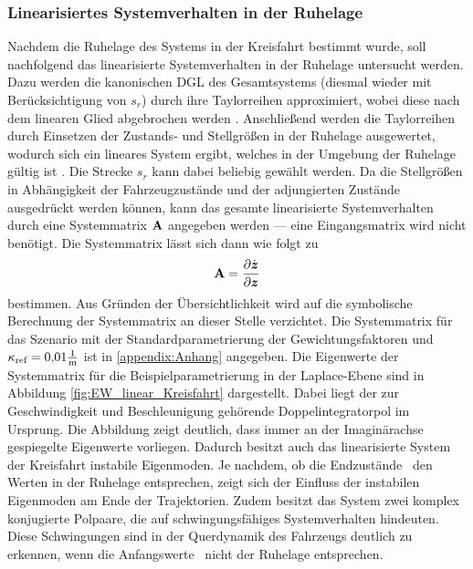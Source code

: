 \subsubsection{Linearisiertes Systemverhalten in der Ruhelage}\label{subsubsec:Linearisierung}
Nachdem die Ruhelage des Systems in der Kreisfahrt bestimmt wurde, soll nachfolgend das linearisierte Systemverhalten in der Ruhelage untersucht werden. Dazu werden die kanonischen \gls{DGL} des Gesamtsystems (diesmal wieder mit Berücksichtigung von $s_r$) durch ihre Taylorreihen approximiert, wobei diese nach dem linearen Glied abgebrochen werden \cite{Modellbildung}. Anschließend werden die Taylorreihen durch Einsetzen der Zustands- und Stellgrößen in der Ruhelage ausgewertet, wodurch sich ein lineares System ergibt, welches in der Umgebung der Ruhelage gültig ist \cite{Modellbildung}. Die Strecke $s_r$ kann dabei beliebig gewählt werden. Da die Stellgrößen in Abhängigkeit der Fahrzeugzustände und der adjungierten Zustände ausgedrückt werden können, kann das gesamte linearisierte Systemverhalten durch eine Systemmatrix ${\boldsymbol{\mathrm{A}}}$ angegeben werden --- eine Eingangsmatrix wird nicht benötigt. Die Systemmatrix lässt sich dann wie folgt zu
\begin{equation}
{\ensuremath{\boldsymbol{\mathrm{A}}}} = \frac{\partial \dot{\boldsymbol{z}}}{\partial \boldsymbol{z}}
\end{equation}
bestimmen. Aus Gründen der Übersichtlichkeit wird auf die symbolische Berechnung der Systemmatrix an dieser Stelle verzichtet. Die Systemmatrix für das Szenario mit der Standardparametrierung der Gewichtungsfaktoren und $\kappa_{\textrm{ref}} = 0{,}01\frac{1}{\mathrm{m}}$ ist in \ref{appendix:Anhang} angegeben. Die Eigenwerte der Systemmatrix für die Beispielparametrierung in der Laplace-Ebene sind in Abbildung \ref{fig:EW_linear_Kreisfahrt} dargestellt. Dabei liegt der zur Geschwindigkeit und Beschleunigung gehörende Doppelintegratorpol im Ursprung. Die Abbildung zeigt deutlich, dass immer an der Imaginärachse gespiegelte Eigenwerte vorliegen. Dadurch besitzt auch das linearisierte System der Kreisfahrt instabile Eigenmoden. Je nachdem, ob die Endzustände \zoftf~den Werten in der Ruhelage entsprechen, zeigt sich der Einfluss der instabilen Eigenmoden am Ende der Trajektorien. Zudem besitzt das System zwei komplex konjugierte Polpaare, die auf schwingungsfähiges Systemverhalten hindeuten. Diese Schwingungen sind in der Querdynamik des Fahrzeugs deutlich zu erkennen, wenn die Anfangswerte \zzero~nicht der Ruhelage entsprechen.
